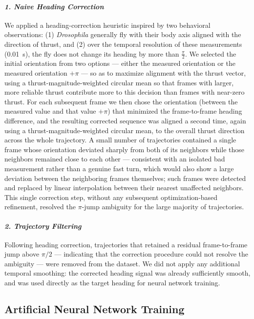 \documentclass[11pt]{article}
\begin{document}
\paragraph*{\textit{1. Naive Heading Correction}}
We applied a heading-correction heuristic inspired by two behavioral observations: (1) \emph{Drosophila} generally fly with their body axis aligned with the direction of thrust, and (2) over the temporal resolution of these measurements (0.01~s), the fly does not change its heading by more than $\frac{\pi}{2}$. We selected the initial orientation from two options --- either the measured orientation or the measured orientation $+\pi$ --- so as to maximize alignment with the thrust vector, using a thrust-magnitude-weighted circular mean so that frames with larger, more reliable thrust contribute more to this decision than frames with near-zero thrust. For each subsequent frame we then chose the orientation (between the measured value and that value $+\pi$) that minimized the frame-to-frame heading difference, and the resulting corrected sequence was aligned a second time, again using a thrust-magnitude-weighted circular mean, to the overall thrust direction across the whole trajectory. A small number of trajectories contained a single frame whose orientation deviated sharply from both of its neighbors while those neighbors remained close to each other --- consistent with an isolated bad measurement rather than a genuine fast turn, which would also show a large deviation between the neighboring frames themselves; such frames were detected and replaced by linear interpolation between their nearest unaffected neighbors. This single correction step, without any subsequent optimization-based refinement, resolved the $\pi$-jump ambiguity for the large majority of trajectories.

\paragraph*{\textit{2. Trajectory Filtering}}
Following heading correction, trajectories that retained a residual frame-to-frame jump above $\pi/2$ --- indicating that the correction procedure could not resolve the ambiguity --- were removed from the dataset. We did not apply any additional temporal smoothing: the corrected heading signal was already sufficiently smooth, and was used directly as the target heading for neural network training.



\subsection*{Artificial Neural Network Training}
\end{document}

